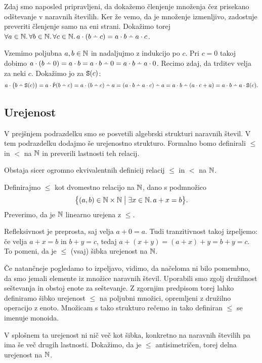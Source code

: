 Zdaj smo naposled pripravljeni, da dokažemo členjenje množenja čez prisekano odštevanje v naravnih številih. Ker že vemo, da je množenje izmenljivo, zadostuje preveriti členjenje samo na eni strani. Dokažimo torej $\all{a \in \NN}\all{b \in \NN}\all{c \in \NN}{a \cdot (b \monus c) = a \cdot b \monus a \cdot c}$.

Vzemimo poljubna $a, b \in \mathbb{N}$ in nadaljujmo z indukcijo po $c$. Pri $c = 0$ takoj dobimo $a \cdot (b \monus 0) = a \cdot b = a \cdot b \monus 0 = a \cdot b \monus a \cdot 0$. Recimo zdaj, da trditev velja za neki $c$. Dokažimo jo za $\mathtt{S}(c)$:
\[a \cdot \big(b \monus \suc(c)\big) = a \cdot \tprd(b \monus c) = a \cdot (b \monus c) \monus a = (a \cdot b \monus a \cdot c) \monus a = a \cdot b \monus (a \cdot c + a) = a \cdot b \monus a \cdot \suc(c).\]

\subsection{Urejenost}\label{podrazdelek:urejenost-na-naravnih-stevilih}

V prejšnjem podrazdelku smo se posvetili algebrski strukturi naravnih števil. V tem podrazdelku dodajmo še urejenostno strukturo. Formalno bomo definirali $\leq$ in $<$ na $\mathbb{N}$ in preverili lastnosti teh relacij.

Obstaja sicer ogromno ekvivalentnih definicij relacij $\leq$ in $<$ na $\mathbb{N}$. 

Definirajmo $\leq$ kot dvomestno relacijo na $\mathbb{N}$, dano s podmnožico
\[\set[1]{(a, b) \in \NN \times \NN}{\some{x \in \NN}{a + x = b}}.\]
Preverimo, da je $\mathbb{N}$ linearno urejena z $\leq$.

Refleksivnost je preprosta, saj velja $a + 0 = a$. Tudi tranzitivnost takoj izpeljemo: če velja $a + x = b$ in $b + y = c$, tedaj $a + (x + y) = (a + x) + y = b + y = c$. To pomeni, da je $\leq$ (vsaj) šibka urejenost na $\mathbb{N}$.

Če natančneje pogledamo to izpeljavo, vidimo, da načeloma ni bilo pomembno, da smo jemali elemente iz množice naravnih števil. Uporabili smo zgolj družilnost seštevanja in obstoj enote za seštevanje. Z zgornjim predpisom torej lahko definiramo šibko urejenost $\leq$ na poljubni množici, opremljeni z družilno operacijo z enoto. Množicam s tako strukturo rečemo  in tako definiran $\leq$ se imenuje  monoida.

V splošnem ta urejenost ni nič več kot šibka, konkretno na naravnih številih pa ima še več drugih lastnosti. Dokažimo, da je $\leq$ antisimetričen, torej delna urejenost na $\mathbb{N}$.

